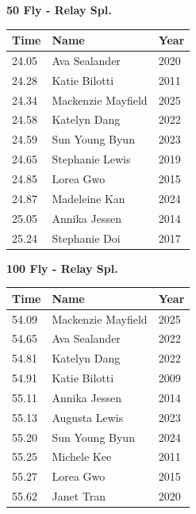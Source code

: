 \vspace{1.2em}
\noindent\begin{minipage}[t]{0.48\textwidth}
\centering
\textbf{\textcolor{teamprimary}{50 Fly - Relay Spl.}}\par
\vspace{0.5em}
\centering
\small
\renewcommand{\arraystretch}{1.0}
\setlength{\tabcolsep}{4pt}
\begin{tabular}{@{}p{1.8cm}p{3.0cm}p{1.0cm}@{}}
\toprule
\textbf{Time} & \textbf{Name} & \textbf{Year} \\
\midrule
24.05 & Ava Sealander & 2020 \\
24.28 & Katie Bilotti & 2011 \\
24.34 & Mackenzie Mayfield & 2025 \\
24.58 & Katelyn Dang & 2022 \\
24.59 & Sun Young Byun & 2023 \\
24.65 & Stephanie Lewis & 2019 \\
24.85 & Lorea Gwo & 2015 \\
24.87 & Madeleine Kan & 2024 \\
25.05 & Annika Jessen & 2014 \\
25.24 & Stephanie Doi & 2017 \\
\bottomrule
\end{tabular}
\end{minipage}
\hfill
\begin{minipage}[t]{0.48\textwidth}
\centering
\textbf{\textcolor{teamprimary}{100 Fly - Relay Spl.}}\par
\vspace{0.5em}
\centering
\small
\renewcommand{\arraystretch}{1.0}
\setlength{\tabcolsep}{4pt}
\begin{tabular}{@{}p{1.8cm}p{3.0cm}p{1.0cm}@{}}
\toprule
\textbf{Time} & \textbf{Name} & \textbf{Year} \\
\midrule
54.09 & Mackenzie Mayfield & 2025 \\
54.65 & Ava Sealander & 2022 \\
54.81 & Katelyn Dang & 2022 \\
54.91 & Katie Bilotti & 2009 \\
55.11 & Annika Jessen & 2014 \\
55.13 & Augusta Lewis & 2023 \\
55.20 & Sun Young Byun & 2024 \\
55.25 & Michele Kee & 2011 \\
55.27 & Lorea Gwo & 2015 \\
55.62 & Janet Tran & 2020 \\
\bottomrule
\end{tabular}
\end{minipage}
